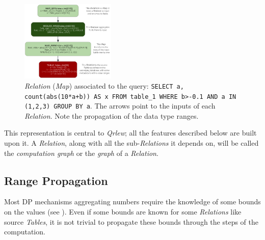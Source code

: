 \documentclass[letterpaper]{article} %
\newcommand{\qrlew}{\emph{Qrlew}}
\begin{document}
\begin{figure}[t]
    \centering
    \includegraphics[width=0.4\textwidth]{figures/relation}
    \caption{\emph{Relation} (\emph{Map}) associated to the query: \texttt{SELECT a, count(abs(10*a+b)) AS x FROM table\_1 WHERE b>-0.1 AND a IN (1,2,3) GROUP BY a}. The arrows point to the inputs of each \emph{Relation}. Note the propagation of the data type ranges.}
    \label{process}
\end{figure}

This representation is central to \qrlew{}; all the features described below are built upon it. A \emph{Relation}, along with all the sub-\emph{Relations} it depends on, will be called the \emph{computation graph} or the \emph{graph} of a \emph{Relation}.

\subsection{Range Propagation}
\label{sec:range_propagation}

Most DP mechanisms aggregating numbers require the knowledge of some bounds on the values (see \cite{dwork2014algorithmic}).
Even if some bounds are known for some \emph{Relations} like source \emph{Tables}, it is not trivial to propagate these bounds through the steps of the computation.
\end{document}
